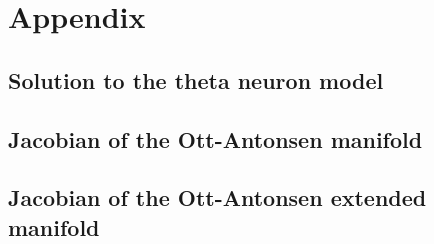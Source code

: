 \newpage
\section{Appendix}
\subsection{Solution to the theta neuron model}
\subsection{Jacobian of the Ott-Antonsen manifold}
\subsection{Jacobian of the Ott-Antonsen extended manifold}
